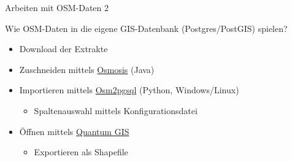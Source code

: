 \documentclass{beamer}
\begin{document}
\begin{frame}{Arbeiten mit OSM-Daten 2}

Wie OSM-Daten in die eigene GIS-Datenbank (Postgres/PostGIS) spielen?
\begin{itemize}
  \item Download der Extrakte
  \item Zuschneiden mittels \href{http://wiki.openstreetmap.org/wiki/Osmosis}{Osmosis} (Java)
  \item Importieren mittels \href{http://wiki.openstreetmap.org/wiki/Osm2pgsql}{Osm2pgsql} (Python, Windows/Linux)
	\begin{itemize}
	  \item Spaltenauswahl mittels Konfigurationsdatei
	\end{itemize}

  \item Öffnen mittels \href{http://www.qgis.org}{Quantum GIS}

	\begin{itemize}
	  \item Exportieren als Shapefile
	\end{itemize}

\end{itemize}

\end{frame}
\end{document}
